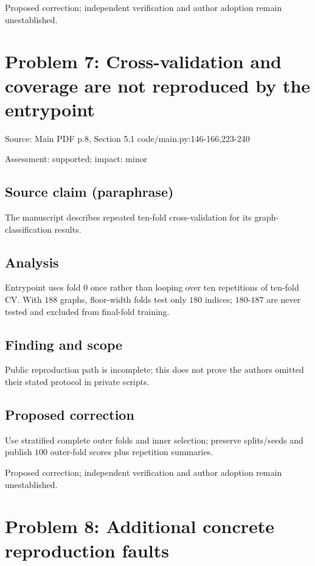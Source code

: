 \documentclass[11pt]{article}
\begin{document}
Proposed correction; independent verification and author adoption remain unestablished.

\section*{Problem 7: Cross-validation and coverage are not reproduced by the entrypoint}

Source: Main PDF p.8, Section 5.1 code/main.py:146-166,223-240

Assessment: supported; impact: minor

\subsection*{Source claim (paraphrase)}

The manuscript describes repeated ten-fold cross-validation for its graph-classification results.

\subsection*{Analysis}

Entrypoint uses fold \(0\) once rather than looping over ten repetitions of ten-fold CV. With \(188\) graphs, floor-width folds test only \(180\) indices; \(180\)-\(187\) are never tested and excluded from final-fold training.

\subsection*{Finding and scope}

Public reproduction path is incomplete; this does not prove the authors omitted their stated protocol in private scripts.

\subsection*{Proposed correction}

Use stratified complete outer folds and inner selection; preserve splits/seeds and publish \(100\) outer-fold scores plus repetition summaries.

Proposed correction; independent verification and author adoption remain unestablished.

\section*{Problem 8: Additional concrete reproduction faults}
\end{document}
